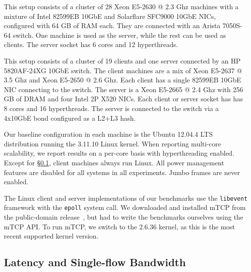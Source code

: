 
 
 This setup consists of a
cluster of 28 Xeon E5-2630 @ 2.3 Ghz machines with a mixture of
Intel 82599EB 10GbE and Solarflare SFC9000 10GbE NICs, configured
with 64 GB of RAM each. They are connected with an Arista 7050S-64
switch. One machine is used as the server, while the rest can be used
as clients. The server socket has 6 cores and 12 hyperthreads.

 This setup consists of a cluster of 19
clients and one server connected by an HP 5820AF-24XG 10GbE switch.
The client machines are a mix of Xeon E5-2637 @ 3.5 Ghz and Xeon
E5-2650 @ 2.6 Ghz.  Each client has a single 82599EB 10GbE NIC
connecting to the switch.  The server is a Xeon E5-2665 @ 2.4 Ghz with
256 GB of DRAM and four Intel 2P X520 NICs.  Each client or server
socket has has 8 cores and 16 hyperthreads.  The server is connected
to the switch via a 4x10GbE bond configured as a L2+L3 hash.

 Our baseline configuration in each
machine is the Ubuntu 12.04.4 LTS distribution running the 3.11.10
Linux kernel.  When reporting multi-core scalability, we report
results on a per-core basis with hyperthreading enabled.  Except for
\S\ref{sec:eval:netpipe}, client machines always run Linux. All power
management features are disabled for all systems in all
experiments. Jumbo frames are never enabled.




%

%


The Linux client and server implementations of our benchmarks use the
\texttt{libevent} framework with the \texttt{epoll} system call.  We
downloaded and installed mTCP from the public-domain
release~\cite{url:mtcp}, but had to write the benchmarks ourselves
using the mTCP API.  To run mTCP, we switch to the 2.6.36 kernel, as
this is the most recent supported kernel version.

\subsection{Latency and Single-flow Bandwidth}
\label{sec:eval:netpipe}

